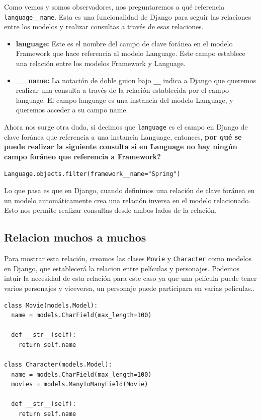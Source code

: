\documentclass[10pt, a4paper]{article}
\newcommand{\mpy}[1]{\texttt{#1}}
\begin{document}
Como vemos y somos observadores, nos preguntaremos a qué referencia \mpy{language__name}. Esta es una funcionalidad de Django para seguir las relaciones entre los modelos y realizar consultas a través de esas relaciones.

\begin{itemize}
  \item \textbf{language:} Este es el nombre del campo de clave foránea en el modelo Framework que hace referencia al modelo Language. Este campo establece una relación entre los modelos Framework y Language.

  \item \textbf{\_\_name:} La notación de doble guion bajo \mpy{__} indica a Django que queremos realizar una consulta a través de la relación establecida por el campo language. El campo language es una instancia del modelo Language, y queremos acceder a su campo name.
\end{itemize}

Ahora nos surge otra duda, si decimos que \mpy{language} es el campo en Django de clave foránea que referencia a una instancia Language, entonces, \textbf{por qué se puede realizar la siguiente consulta si en Language no hay ningún campo foráneo que referencia a Framework?}

\begin{verbatim}
Language.objects.filter(framework__name="Spring")
\end{verbatim}

Lo que pasa es que en Django, cuando definimos una relación de clave foránea en un modelo automáticamente crea una relación inversa en el modelo relacionado. Esto nos permite realizar consultas desde ambos lados de la relación.

\subsection{Relacion muchos a muchos}
Para mostrar esta relación, creamos las clases \mpy{Movie} y \mpy{Character} como modelos en Django, que establecerá la relacion entre películas y personajes. Podemos intuir la necesidad de esta relación para este caso ya que una película puede tener varios personajes y viceversa, un personaje puede participara en varias películas..

\begin{verbatim}
class Movie(models.Model):
  name = models.CharField(max_length=100)

  def __str__(self):
    return self.name

class Character(models.Model):
  name = models.CharField(max_length=100)
  movies = models.ManyToManyField(Movie)

  def __str__(self):
    return self.name
\end{verbatim}
\end{document}
